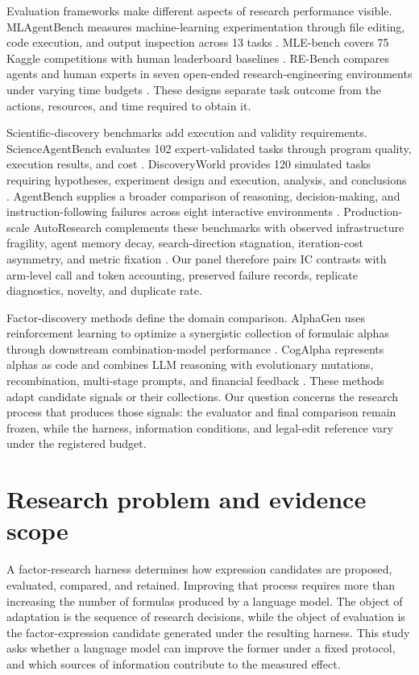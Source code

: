Evaluation frameworks make different aspects of research performance visible. MLAgentBench measures machine-learning experimentation through file editing, code execution, and output inspection across 13 tasks \citep{huang2023mlagentbench}. MLE-bench covers 75 Kaggle competitions with human leaderboard baselines \citep{chan2024mlebench}. RE-Bench compares agents and human experts in seven open-ended research-engineering environments under varying time budgets \citep{wijk2024rebench}. These designs separate task outcome from the actions, resources, and time required to obtain it.

Scientific-discovery benchmarks add execution and validity requirements. ScienceAgentBench evaluates 102 expert-validated tasks through program quality, execution results, and cost \citep{chen2024scienceagentbench}. DiscoveryWorld provides 120 simulated tasks requiring hypotheses, experiment design and execution, analysis, and conclusions \citep{jansen2024discoveryworld}. AgentBench supplies a broader comparison of reasoning, decision-making, and instruction-following failures across eight interactive environments \citep{liu2023agentbench}. Production-scale AutoResearch complements these benchmarks with observed infrastructure fragility, agent memory decay, search-direction stagnation, iteration-cost asymmetry, and metric fixation \citep{chandran2026production}. Our panel therefore pairs IC contrasts with arm-level call and token accounting, preserved failure records, replicate diagnostics, novelty, and duplicate rate.

Factor-discovery methods define the domain comparison. AlphaGen uses reinforcement learning to optimize a synergistic collection of formulaic alphas through downstream combination-model performance \citep{yu2023generating}. CogAlpha represents alphas as code and combines LLM reasoning with evolutionary mutations, recombination, multi-stage prompts, and financial feedback \citep{liu2025cogalpha}. These methods adapt candidate signals or their collections. Our question concerns the research process that produces those signals: the evaluator and final comparison remain frozen, while the harness, information conditions, and legal-edit reference vary under the registered budget.

\section{Research problem and evidence scope}
\label{sec:problem}

A factor-research harness determines how expression candidates are proposed, evaluated, compared, and retained. Improving that process requires more than increasing the number of formulas produced by a language model. The object of adaptation is the sequence of research decisions, while the object of evaluation is the factor-expression candidate generated under the resulting harness. This study asks whether a language model can improve the former under a fixed protocol, and which sources of information contribute to the measured effect.

